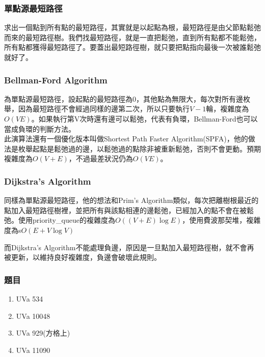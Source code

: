 \subsubsection{單點源最短路徑}
求出一個點到所有點的最短路徑，其實就是以起點為根，最短路徑是由父節點鬆弛而來的最短路徑樹。我們找最短路徑，就是一直把鬆弛，直到所有點都不能鬆弛，所有點都獲得最短路徑了。要蓋出最短路徑樹，就只要把點指向最後一次被誰鬆弛就好了。
\subsubsection{Bellman-Ford Algorithm}
為單點源最短路徑，設起點的最短路徑為0，其他點為無限大，每次對所有邊枚舉，因為最短路徑不會經過同樣的邊第二次，所以只要執行$V-1$輪，複雜度為$O(VE)$。如果執行第V次時還有邊可以鬆弛，代表有負環，Bellman-Ford也可以當成負環的判斷方法。\\

此演算法還有一個優化版本叫做Shortest Path Faster Algorithm(SPFA)，他的做法是枚舉起點是鬆弛過的邊，以鬆弛過的點除非被重新鬆弛，否則不會更動。預期複雜度為$O(V+E)$，不過最差狀況仍為$O(VE)$。
\subsubsection{Dijkstra’s Algorithm}
同樣為單點源最短路徑，他的想法和Prim's Algorithm類似，每次把離樹根最近的點加入最短路徑樹裡，並把所有與該點相連的邊鬆弛，已經加入的點不會在被鬆弛。使用priority\_queue的複雜度為$O((V+E)\log E)$，使用費波那契堆，複雜度為s$O(E+V\log V)$

而Dijkstra’s Algorithm不能處理負邊，原因是一旦點加入最短路徑樹，就不會再被更新，以維持良好複雜度，負邊會破壞此規則。
\subsubsection{題目}
\begin{enumerate}
\item UVa 534
\item UVa 10048
\item UVa 929(方格上)
\item UVa 11090
\end{enumerate}
